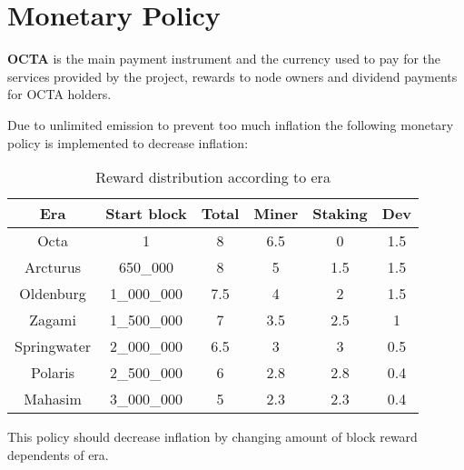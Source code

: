 \section{Monetary Policy}
\label{sec:mp}

\textbf{OCTA} is the main payment instrument and the currency used to pay for the services provided by the project, rewards to node owners and dividend payments for OCTA holders.

Due to unlimited emission to prevent too much inflation the following monetary policy is implemented to decrease inflation:

\begin{table}[h!]
\centering
\begin{tabular}{||c c c c c c||}
    \hline
        Era & Start block & Total & Miner & Staking & Dev \\ [0.5ex]

        \hline\hline
        Octa & 1 & 8 & 6.5 & 0 & 1.5 \\
        Arcturus & 650\_000 & 8 & 5 & 1.5 & 1.5 \\
        Oldenburg & 1\_000\_000 & 7.5 & 4 & 2 & 1.5 \\
        Zagami & 1\_500\_000 & 7 & 3.5 & 2.5 & 1 \\
        Springwater & 2\_000\_000 & 6.5 & 3 & 3 & 0.5 \\
        Polaris & 2\_500\_000 & 6 & 2.8 & 2.8 & 0.4 \\
        Mahasim & 3\_000\_000 & 5 & 2.3 & 2.3 & 0.4 \\ [1ex]
    \hline

\end{tabular}
\caption{Reward distribution according to era}
\label{table:1}
\end{table}

This policy should decrease inflation by changing amount of block reward dependents of era.

